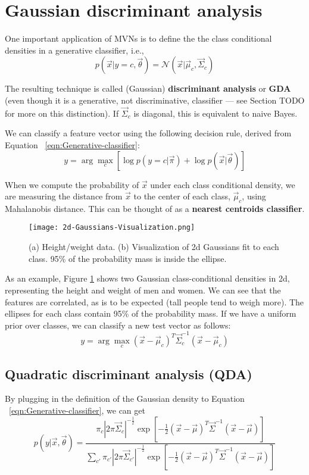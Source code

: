 \section{Gaussian discriminant analysis}
One important application of MVNs is to define the the class conditional densities in a generative classifier, i.e.,
\begin{equation}
p(\vec{x}|y=c,\vec{\theta})=\mathcal{N}(\vec{x}|\vec{\mu}_c,\vec{\Sigma}_c)
\end{equation}

The resulting technique is called (Gaussian) \textbf{discriminant analysis} or \textbf{GDA} (even though it is a generative, not discriminative, classifier — see Section TODO for more on this distinction). If $\vec{\Sigma}_c$ is diagonal, this is equivalent to naive Bayes.

We can classify a feature vector using the following decision rule, derived from Equation ~\eqref{eqn:Generative-classifier}:
\begin{equation}
y=\arg\max_{c} \left[\log p(y=c|\vec{\pi})+\log p(\vec{x}|\vec{\theta})\right]
\end{equation}

When we compute the probability of $\vec{x}$ under each class conditional density, we are measuring the distance from $\vec{x}$ to the center of each class, $\vec{\mu}_c$, using Mahalanobis distance. This can be thought of as a \textbf{nearest centroids classifier}.

\begin{figure}[hbtp]
\centering
    \texttt{[image: 2d-Gaussians-Visualization.png]}
\caption{(a) Height/weight data. (b) Visualization of 2d Gaussians fit to each class. 95\% of the probability mass is inside the ellipse.}
\label{fig:2d-Gaussians-Visualization} 
\end{figure}

As an example, Figure \ref{fig:2d-Gaussians-Visualization} shows two Gaussian class-conditional densities in 2d, representing the height and weight of men and women. We can see that the features are correlated, as is to be expected (tall people tend to weigh more). The ellipses for each class contain 95\% of the probability mass. If we have a uniform prior over classes, we can classify a new test vector as follows:
\begin{equation}
y=\arg\max_{c} (\vec{x}-\vec{\mu}_c)^T\vec{\Sigma}_c^{-1}(\vec{x}-\vec{\mu}_c)
\end{equation}


\subsection{Quadratic discriminant analysis (QDA)}
By plugging in the definition of the Gaussian density to Equation ~\eqref{eqn:Generative-classifier}, we can get
\begin{equation}\label{eqn:QDA}
p(y|\vec{x},\vec{\theta})=\dfrac{\pi_c|2\pi\vec{\Sigma}_c|^{-\frac{1}{2}}\exp\left[-\frac{1}{2}(\vec{x}-\vec{\mu})^T\vec{\Sigma}^{-1}(\vec{x}-\vec{\mu})\right]}{\sum_{c'}\pi_{c'}|2\pi\vec{\Sigma}_{c'}|^{-\frac{1}{2}}\exp\left[-\frac{1}{2}(\vec{x}-\vec{\mu})^T\vec{\Sigma}^{-1}(\vec{x}-\vec{\mu})\right]}
\end{equation}

